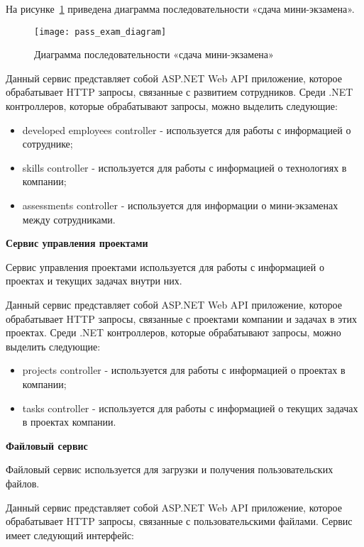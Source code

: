На рисунке~\ref{fig:pass_exam_diagram} приведена диаграмма последовательности «сдача мини-экзамена». 

\begin{figure}[ht]
    \centering
    \texttt{[image: pass\_exam\_diagram]}
    \caption{Диаграмма последовательности «сдача мини-экзамена»}\label{fig:pass_exam_diagram}
\end{figure}

Данный сервис представляет собой ASP.NET Web API приложение, которое обрабатывает HTTP запросы, связанные с развитием сотрудников. Среди .NET контроллеров, которые обрабатывают запросы, можно выделить следующие:

\begin{itemize}
    \item developed employees controller - используется для работы с информацией о сотруднике;
    \item skills controller - используется для работы с информацией о технологиях в компании;
    \item assessments controller - используется для информации о мини-экзаменах между сотрудниками.
\end{itemize}

\bigskip
\textbf{Сервис управления проектами}

Сервис управления проектами используется для работы с информацией о проектах и текущих задачах внутри них.

Данный сервис представляет собой ASP.NET Web API приложение, которое обрабатывает HTTP запросы, связанные с проектами компании и задачах в этих проектах. Среди .NET контроллеров, которые обрабатывают запросы, можно выделить следующие:

\begin{itemize}
    \item projects controller - используется для работы с информацией о проектах в компании;
    \item tasks controller - используется для работы с информацией о текущих задачах в проектах компании.
\end{itemize}

\bigskip
\textbf{Файловый сервис}

Файловый сервис используется для загрузки и получения пользовательских файлов.

Данный сервис представляет собой ASP.NET Web API приложение, которое обрабатывает HTTP запросы, связанные с пользовательскими файлами. Сервис имеет следующий интерфейс:

